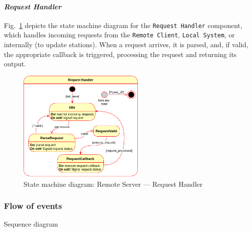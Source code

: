 \paragraph{\emph{Request Handler}}
Fig.~\ref{fig:state-mach-rs-req} depicts the state machine diagram for the
\texttt{Request Handler} component, which handles incoming requests from the
  \texttt{Remote Client}, \texttt{Local System}, or internally (to update stations). When a request arrives, it is parsed, and, if valid,
  the appropriate callback is triggered, processing the request and returning
  its output.
%  
\begin{figure}[htb!]
  \centering
  \includegraphics[width=0.55\textwidth]{img/state-mach-rs-req.png}%
  \caption{State machine diagram: Remote Server --- Request Handler}%
  \label{fig:state-mach-rs-req}
\end{figure}
%
%

\subsubsection{Flow of events}
\label{sec:flow-events-2}
Sequence diagram


